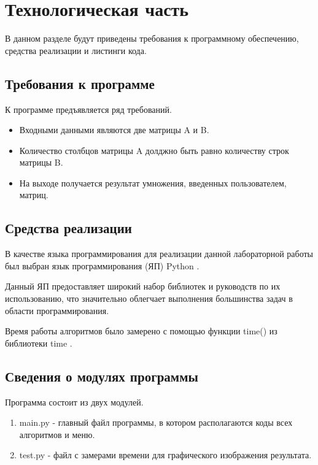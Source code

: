 \chapter{Технологическая часть}

В данном разделе будут приведены требования к программному обеспечению, средства реализации и листинги кода.

\section{Требования к программе}

К программе предъявляется ряд требований.
\begin{itemize}
	\item Входными данными являются две матрицы A и B. 
	\item Количество столбцов матрицы A долджно быть равно количеству строк матрицы B.
	\item На выходе получается результат умножения, введенных пользователем, матриц.

\end{itemize}


\section{Средства реализации}

В качестве языка программирования для реализации данной лабораторной работы был выбран язык программирования (ЯП) Python \cite{pythonlang}. 

Данный ЯП предоставляет широкий набор библиотек и руководств по их использованию, что значительно облегчает выполнения большинства задач в области программирования. 

Время работы алгоритмов было замерено с помощью функции time() из библиотеки time \cite{pythonlangtime}.



\section{Сведения о модулях программы}
Программа состоит из двух модулей.
\begin{enumerate}
	\item main.py - главный файл программы, в котором располагаются коды всех алгоритмов и меню.
	\item test.py - файл с замерами времени для графического изображения результата.
\end{enumerate}


